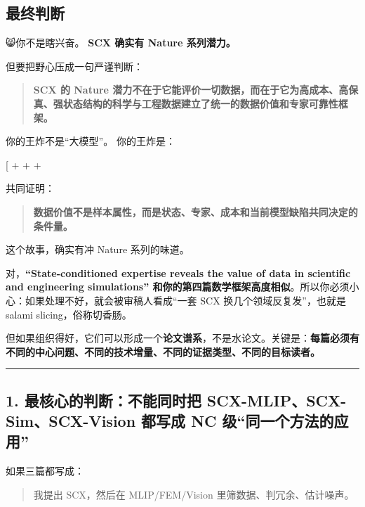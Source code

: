 \documentclass[
  12pt,
]{ctexart}
\begin{document}
\subsection{最终判断}\label{ux6700ux7ec8ux5224ux65ad-10}

😸你不是瞎兴奋。 \textbf{SCX 确实有 Nature 系列潜力。}

但要把野心压成一句严谨判断：

\begin{quote}
\textbf{SCX 的 Nature
潜力不在于它能评价一切数据，而在于它为高成本、高保真、强状态结构的科学与工程数据建立了统一的数据价值和专家可靠性框架。}
\end{quote}

你的王炸不是``大模型''。 你的王炸是：

{[}  +  +  +
\text{semiconductor simulation}{]}

共同证明：

\begin{quote}
\textbf{数据价值不是样本属性，而是状态、专家、成本和当前模型缺陷共同决定的条件量。}
\end{quote}

这个故事，确实有冲 Nature 系列的味道。

对，\textbf{``State-conditioned expertise reveals the value of data in
scientific and engineering simulations''
和你的第四篇数学框架高度相似}。所以你必须小心：如果处理不好，就会被审稿人看成``一套
SCX 换几个领域反复发''，也就是 salami slicing，俗称切香肠。

但如果组织得好，它们可以形成一个\textbf{论文谱系}，不是水论文。关键是：\textbf{每篇必须有不同的中心问题、不同的技术增量、不同的证据类型、不同的目标读者。}

\begin{center}\rule{0.5\linewidth}{0.5pt}\end{center}

\subsection{1. 最核心的判断：不能同时把 SCX-MLIP、SCX-Sim、SCX-Vision
都写成 NC
级``同一个方法的应用''}\label{ux6700ux6838ux5fc3ux7684ux5224ux65adux4e0dux80fdux540cux65f6ux628a-scx-mlipscx-simscx-vision-ux90fdux5199ux6210-nc-ux7ea7ux540cux4e00ux4e2aux65b9ux6cd5ux7684ux5e94ux7528}

如果三篇都写成：

\begin{quote}
我提出 SCX，然后在 MLIP/FEM/Vision 里筛数据、判冗余、估计噪声。
\end{quote}
\end{document}

